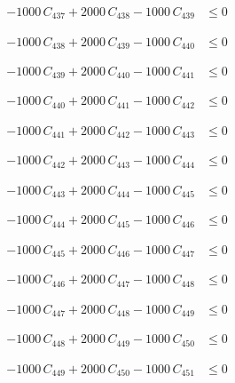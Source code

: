 \documentclass[a4paper,11pt]{article}
\begin{document}
\begin{align}
-1000\,C_{437} + 2000\,C_{438} - 1000\,C_{439} &\leq 0 \nonumber
\end{align}

\begin{align}
-1000\,C_{438} + 2000\,C_{439} - 1000\,C_{440} &\leq 0 \nonumber
\end{align}

\begin{align}
-1000\,C_{439} + 2000\,C_{440} - 1000\,C_{441} &\leq 0 \nonumber
\end{align}

\begin{align}
-1000\,C_{440} + 2000\,C_{441} - 1000\,C_{442} &\leq 0 \nonumber
\end{align}

\begin{align}
-1000\,C_{441} + 2000\,C_{442} - 1000\,C_{443} &\leq 0 \nonumber
\end{align}

\begin{align}
-1000\,C_{442} + 2000\,C_{443} - 1000\,C_{444} &\leq 0 \nonumber
\end{align}

\begin{align}
-1000\,C_{443} + 2000\,C_{444} - 1000\,C_{445} &\leq 0 \nonumber
\end{align}

\begin{align}
-1000\,C_{444} + 2000\,C_{445} - 1000\,C_{446} &\leq 0 \nonumber
\end{align}

\begin{align}
-1000\,C_{445} + 2000\,C_{446} - 1000\,C_{447} &\leq 0 \nonumber
\end{align}

\begin{align}
-1000\,C_{446} + 2000\,C_{447} - 1000\,C_{448} &\leq 0 \nonumber
\end{align}

\begin{align}
-1000\,C_{447} + 2000\,C_{448} - 1000\,C_{449} &\leq 0 \nonumber
\end{align}

\begin{align}
-1000\,C_{448} + 2000\,C_{449} - 1000\,C_{450} &\leq 0 \nonumber
\end{align}

\begin{align}
-1000\,C_{449} + 2000\,C_{450} - 1000\,C_{451} &\leq 0 \nonumber
\end{align}
\end{document}
